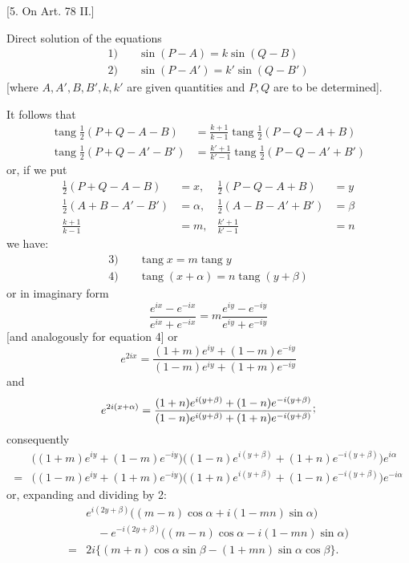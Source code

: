 \begin{center}
[5. On Art. 78 II.]
\end{center}
Direct solution of the equations
\[
\begin{aligned}
1)\quad&\sin(P-A)=k\sin(Q-B)\\
2)\quad&\sin(P-A')=k'\sin(Q-B')
\end{aligned}
\]
[where \(A,A',B,B',k,k'\) are given quantities and \(P,Q\) are to be determined].

It follows that
\[
\begin{aligned}
\operatorname{tang}\tfrac12(P+Q-A-B)&=\frac{k+1}{k-1}\operatorname{tang}\tfrac12(P-Q-A+B)\\
\operatorname{tang}\tfrac12(P+Q-A'-B')&=\frac{k'+1}{k'-1}\operatorname{tang}\tfrac12(P-Q-A'+B')
\end{aligned}
\]
or, if we put
\[
\begin{aligned}
\tfrac12(P+Q-A-B)&=x, &\tfrac12(P-Q-A+B)&=y\\
\tfrac12(A+B-A'-B')&=\alpha, &\tfrac12(A-B-A'+B')&=\beta\\
\frac{k+1}{k-1}&=m, &\frac{k'+1}{k'-1}&=n
\end{aligned}
\]
we have:
\[
\begin{aligned}
3)\quad&\operatorname{tang}x=m\operatorname{tang}y\\
4)\quad&\operatorname{tang}(x+\alpha)=n\operatorname{tang}(y+\beta)
\end{aligned}
\]
or in imaginary form
\[
\frac{e^{ix}-e^{-ix}}{e^{ix}+e^{-ix}}=m\frac{e^{iy}-e^{-iy}}{e^{iy}+e^{-iy}}
\]
[and analogously for equation 4] or
\[
e^{2ix}=\frac{(1+m)e^{iy}+(1-m)e^{-iy}}{(1-m)e^{iy}+(1+m)e^{-iy}}
\]
and
\[
e^{2i(x+\alpha)}=\frac{(1+n)e^{i(y+\beta)}+(1-n)e^{-i(y+\beta)}}{(1-n)e^{i(y+\beta)}+(1+n)e^{-i(y+\beta)}}\mathpunct{\raisebox{.45ex}{;}}
\]
consequently
\[
\begin{aligned}
&\bigl((1+m)e^{iy}+(1-m)e^{-iy}\bigr)\bigl((1-n)e^{i(y+\beta)}+(1+n)e^{-i(y+\beta)}\bigr)e^{i\alpha}\\
={}&\bigl((1-m)e^{iy}+(1+m)e^{-iy}\bigr)\bigl((1+n)e^{i(y+\beta)}+(1-n)e^{-i(y+\beta)}\bigr)e^{-i\alpha}
\end{aligned}
\]
or, expanding and dividing by 2:
\[
\begin{aligned}
&e^{i(2y+\beta)}\bigl((m-n)\cos\alpha+i(1-mn)\sin\alpha\bigr)\\
&\quad-e^{-i(2y+\beta)}\bigl((m-n)\cos\alpha-i(1-mn)\sin\alpha\bigr)\\
={}&2i\bigl\{(m+n)\cos\alpha\sin\beta-(1+mn)\sin\alpha\cos\beta\bigr\}.
\end{aligned}
\]

